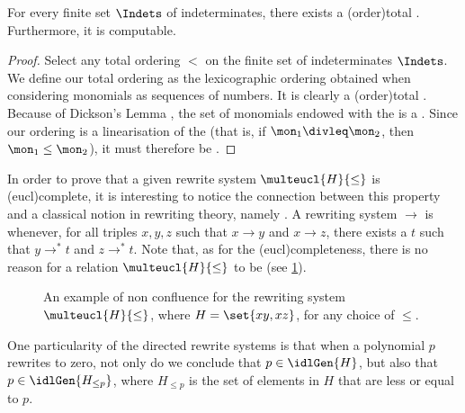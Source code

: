 \begin{lemma}[Folklore]
    \label{lem:monomial-order-exists}
    For every finite set $\Indets$ of indeterminates,
    there exists a 
    \kl(order){total} . Furthermore,
    it is computable.
\end{lemma}
\begin{proof}
    Select any total ordering $<$ on the finite set of
    indeterminates $\Indets$. We define our total ordering
    as the lexicographic ordering obtained when considering 
    monomials as sequences of numbers.
    It is clearly a \kl(order){total}
    .
    Because of Dickson's Lemma \cite{SCSC12},
    the set of monomials endowed with the 
    is a .
    Since our ordering is a linearisation of the 
     (that is, if
    $\mon_1 \divleq \mon_2$, then $\mon_1 \leq \mon_2$),
    it must therefore be 
    \cite{SCSC12}.
\end{proof}

\AP In order to prove that a given rewrite system $\multeucl{H}{\leq}$ is
\kl(eucl){complete}, it is interesting to notice the connection between this
property and a classical notion in rewriting theory, namely . A
rewriting system $\to$ is  whenever, for all triples $x,y,z$
such that $x \to y$ and $x \to z$, there exists a $t$ such that $y \to^* t$ and
$z \to^* t$. Note that, as for the \kl(eucl){completeness}, there is no reason
for a relation $\multeucl{H}{\leq}$ to be  (see
\cref{fig:buchberger-non-confluent}).

\begin{figure}
    \centering
    \caption{
        An example of non confluence
        for the rewriting system
        $\multeucl{H}{\leq}$, where $H = \set{ xy, xz }$,
        for any choice of 
        $\leq$.
    }
    \label{fig:buchberger-non-confluent}
\end{figure}

One particularity of the directed rewrite systems is that when a polynomial $p$
rewrites to zero, not only do we conclude that $p \in \idlGen{H}$, but also
that $p \in \idlGen{H_{\leq p}}$, where $H_{\leq p}$ is the set of elements in
$H$ that are less or equal to $p$.

